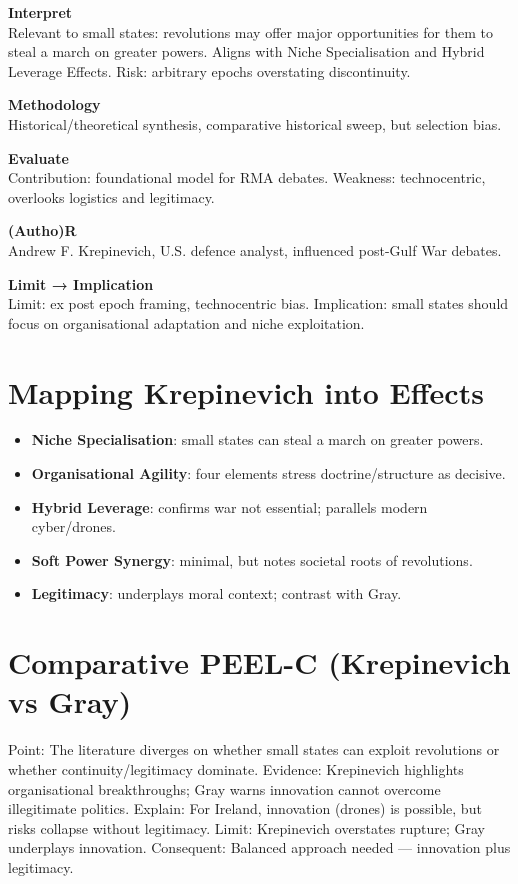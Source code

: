 \textbf{Interpret} \\
Relevant to small states: revolutions may offer major opportunities for them to steal a march on greater powers. Aligns with Niche Specialisation and Hybrid Leverage Effects. Risk: arbitrary epochs overstating discontinuity.  

\textbf{Methodology} \\
Historical/theoretical synthesis, comparative historical sweep, but selection bias.  

\textbf{Evaluate} \\
Contribution: foundational model for RMA debates. Weakness: technocentric, overlooks logistics and legitimacy.  

\textbf{(Autho)R} \\
Andrew F. Krepinevich, U.S. defence analyst, influenced post-Gulf War debates.  

\textbf{Limit → Implication} \\
Limit: ex post epoch framing, technocentric bias.  
Implication: small states should focus on organisational adaptation and niche exploitation.  

\section*{Mapping Krepinevich into Effects}

\begin{itemize}
	\item \textbf{Niche Specialisation}: small states can steal a march on greater powers.  
	\item \textbf{Organisational Agility}: four elements stress doctrine/structure as decisive.  
	\item \textbf{Hybrid Leverage}: confirms war not essential; parallels modern cyber/drones.  
	\item \textbf{Soft Power Synergy}: minimal, but notes societal roots of revolutions.  
	\item \textbf{Legitimacy}: underplays moral context; contrast with Gray.  
\end{itemize}

\section*{Comparative PEEL-C (Krepinevich vs Gray)}

Point: The literature diverges on whether small states can exploit revolutions or whether continuity/legitimacy dominate.  
Evidence: Krepinevich highlights organisational breakthroughs; Gray warns innovation cannot overcome illegitimate politics.  
Explain: For Ireland, innovation (drones) is possible, but risks collapse without legitimacy.  
Limit: Krepinevich overstates rupture; Gray underplays innovation.  
Consequent: Balanced approach needed — innovation plus legitimacy.  

